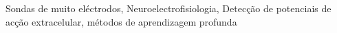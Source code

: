 \begin{palavraschave}
Sondas de muito eléctrodos, Neuroelectrofisiologia, Detecção de potenciais de acção extracelular, métodos de aprendizagem profunda
\end{palavraschave}
\clearpage
\thispagestyle{empty}
\cleardoublepage
